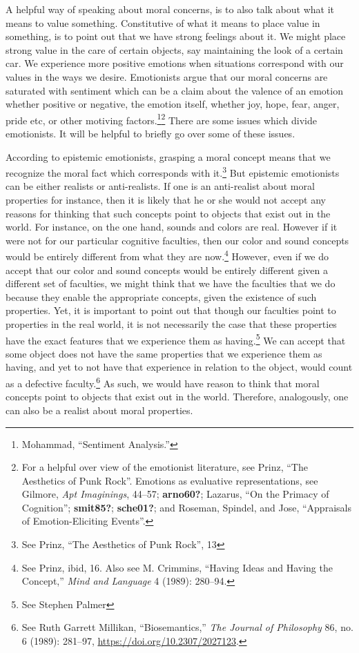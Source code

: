 \documentclass[
  12pt,
]{book}
\theoremstyle{definition}
\theoremstyle{definition}
\theoremstyle{definition}
\theoremstyle{definition}
\theoremstyle{remark}
\begin{document}
A helpful way of speaking about moral concerns, is to also talk about what it means to value something. Constitutive of what it means to place value in something, is to point out that we have strong feelings about it. We might place strong value in the care of certain objects, say maintaining the look of a certain car. We experience more positive emotions when situations correspond with our values in the ways we desire. Emotionists argue that our moral concerns are saturated with sentiment which can be a claim about the valence of an emotion whether positive or negative, the emotion itself, whether joy, hope, fear, anger, pride etc, or other motiving factors.\footnote{Mohammad, {``Sentiment {Analysis}.''}}\footnote{For a helpful over view of the emotionist literature, see Prinz, {``The {Aesthetics} of {Punk Rock}''}. Emotions as evaluative representations, see Gilmore, \emph{Apt {Imaginings}}, 44--57; \textbf{arno60?}; Lazarus, {``On the {Primacy} of {Cognition}''}; \textbf{smit85?}; \textbf{sche01?}; and Roseman, Spindel, and Jose, {``Appraisals of Emotion-Eliciting Events''}.} There are some issues which divide emotionists. It will be helpful to briefly go over some of these issues.

According to epistemic emotionists, grasping a moral concept means that we recognize the moral fact which corresponds with it.\footnote{See Prinz, {``The {Aesthetics} of {Punk Rock}''}, 13} But epistemic emotionists can be either realists or anti-realists. If one is an anti-realist about moral properties for instance, then it is likely that he or she would not accept any reasons for thinking that such concepts point to objects that exist out in the world. For instance, on the one hand, sounds and colors are real. However if it were not for our particular cognitive faculties, then our color and sound concepts would be entirely different from what they are now.\footnote{See Prinz, ibid, 16. Also see M. Crimmins, {``Having Ideas and Having the Concept,''} \emph{Mind and Language} 4 (1989): 280--94.} However, even if we do accept that our color and sound concepts would be entirely different given a different set of faculties, we might think that we have the faculties that we do because they enable the appropriate concepts, given the existence of such properties. Yet, it is important to point out that though our faculties point to properties in the real world, it is not necessarily the case that these properties have the exact features that we experience them as having.\footnote{See Stephen Palmer} We can accept that some object does not have the same properties that we experience them as having, and yet to not have that experience in relation to the object, would count as a defective faculty.\footnote{See Ruth Garrett Millikan, {``Biosemantics,''} \emph{The Journal of Philosophy} 86, no. 6 (1989): 281--97, \url{https://doi.org/10.2307/2027123}.} As such, we would have reason to think that moral concepts point to objects that exist out in the world. Therefore, analogously, one can also be a realist about moral properties.
\end{document}
